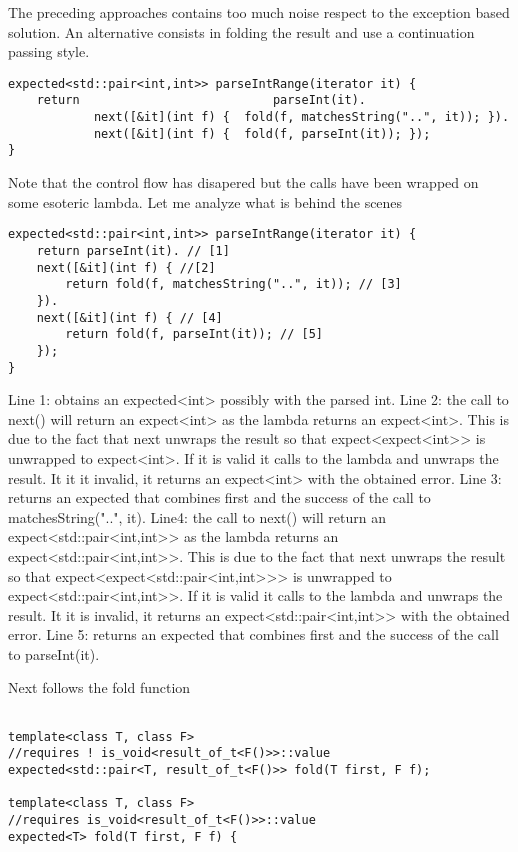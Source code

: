 \documentclass[a4paper,10pt]{article}
\begin{document}
The preceding approaches contains too much noise respect to the exception based solution. An alternative consists in folding the result and use a continuation passing style. 

\begin{lstlisting}
expected<std::pair<int,int>> parseIntRange(iterator it) {
    return                           parseInt(it). 
    		next([&it](int f) {  fold(f, matchesString("..", it)); }). 
    		next([&it](int f) {  fold(f, parseInt(it)); });
}
\end{lstlisting}

Note that the control flow has disapered but the calls have been wrapped on some esoteric lambda. Let me analyze what is behind the scenes

\begin{lstlisting}
expected<std::pair<int,int>> parseIntRange(iterator it) {
    return parseInt(it). // [1]
    next([&it](int f) { //[2]
        return fold(f, matchesString("..", it)); // [3]
    }). 
    next([&it](int f) { // [4]
        return fold(f, parseInt(it)); // [5]
    });
}
\end{lstlisting}

Line 1: obtains an expected<int> possibly with the parsed int. 
Line 2: the call to next() will return an expect<int> as the lambda returns an expect<int>. This is due to the fact that next unwraps the result so that expect<expect<int>> is unwrapped to expect<int>. 
If it is valid it calls to the lambda and unwraps the result. It it it invalid, it returns an expect<int> with the obtained error.
Line 3: returns an expected that combines first and the success of the call to  matchesString("..", it).
Line4:  the call to next() will return an expect<std::pair<int,int>> as the lambda returns an expect<std::pair<int,int>>. This is due to the fact that next unwraps the result so that expect<expect<std::pair<int,int>>> is unwrapped to expect<std::pair<int,int>>. 
If it is valid it calls to the lambda and unwraps the result. It it is invalid, it returns an expect<std::pair<int,int>> with the obtained error.
Line 5: returns an expected that combines first and the success of the call to  parseInt(it).

Next follows the fold function

\begin{lstlisting}

template<class T, class F>
//requires ! is_void<result_of_t<F()>>::value
expected<std::pair<T, result_of_t<F()>> fold(T first, F f);

template<class T, class F>
//requires is_void<result_of_t<F()>>::value
expected<T> fold(T first, F f) {
\end{lstlisting}
\end{document}
